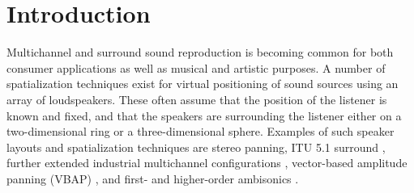 \documentclass[twoside,10pt]{article}
\title{\papertitle}
\begin{document}
    
\maketitle




%
%


\begin{abstract}
Most common techniques for spatialization require the listener to be positioned at a ``sweet spot'' surrounded by loudspeakers. For practical concert, stage, and installation applications such layouts may not be desirable. Distance-based amplitude panning (DBAP) offers an alternative panning-based spatialization method where no assumptions are made concerning the layout of the speaker array nor the position of the listener.  DBAP is implemented both as an external for Max/MSP and as a module for the Jamoma Modular framework.
\end{abstract}








%
%


\section{Introduction}\label{sec:introduction}

Multichannel and surround sound reproduction is becoming common for both consumer applications as well as musical and artistic purposes. A number of spatialization techniques exist for virtual positioning of sound sources using an array of loudspeakers. These often assume that the position of the listener is known and fixed, and that the speakers are surrounding the listener either on a two-dimensional ring or a three-dimensional sphere. Examples of such speaker layouts and spatialization techniques are stereo panning, ITU 5.1 surround \cite{ITU:1993_surround_5:1}, further extended industrial multichannel configurations \cite{Rumsey:2001spatial_audio}, vector-based amplitude panning (VBAP) \cite{Pulkki:1997vbap}, and first- and higher-order ambisonics \cite{Gerzon:1974surround, Poletti:2000holographic_sound}.
\end{document}
